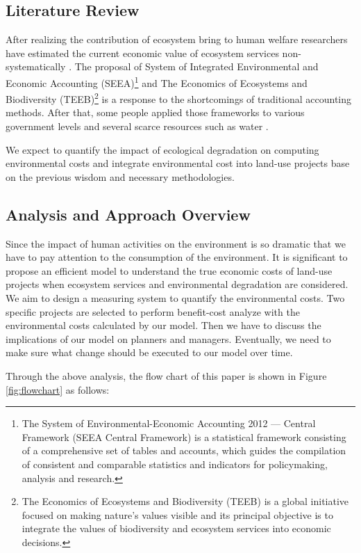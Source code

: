 \documentclass{mcmthesis}
\begin{document}
		\subsection{Literature Review}
			After realizing the contribution of ecosystem bring to human welfare researchers have estimated the current economic value of ecosystem services non-systematically \cite{costanza1997value}. The proposal of System of Integrated Environmental and Economic Accounting (SEEA)\footnote{The System of Environmental-Economic Accounting 2012 — Central Framework (SEEA Central Framework) is a statistical framework consisting of a comprehensive set of tables and accounts, which guides the compilation of consistent and comparable statistics and indicators for policymaking, analysis and research.} and The Economics of Ecosystems and Biodiversity (TEEB)\footnote{The Economics of Ecosystems and Biodiversity (TEEB) is a global initiative focused on making nature’s values visible and its principal objective is to integrate the values of biodiversity and ecosystem services into economic decisions.} is a response to the shortcomings of traditional accounting methods. After that, some people applied those frameworks to various government levels \cite{dalmazzone2013multi} and several scarce resources such as water \cite{pedro2016use}.
			
			We expect to quantify the impact of ecological degradation on computing environmental costs and integrate environmental cost into land-use projects base on the previous wisdom and necessary methodologies.
			
		\subsection{Analysis and Approach Overview}
			
			Since the impact of human activities on the environment is so dramatic that we have to pay attention to the consumption of the environment. It is significant to propose an efficient model to understand the true economic costs of land-use projects when ecosystem services and environmental degradation are considered. We aim to design a measuring system to quantify the environmental costs. Two specific projects are selected to perform benefit-cost analyze with the environmental costs calculated by our model. Then we have to discuss the implications of our model on planners and managers. Eventually, we need to make sure what change should be executed to our model over time.
			
			Through the above analysis, the flow chart of this paper is shown in Figure \ref{fig:flowchart} as follows:
			
\end{document}
